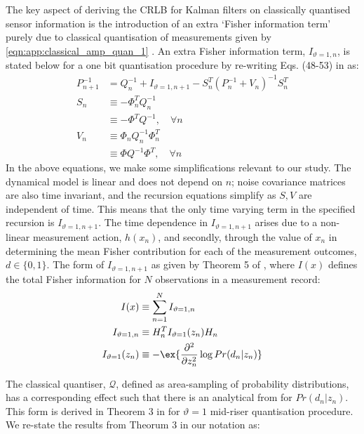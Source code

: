 The key aspect of deriving the CRLB for Kalman filters on classically quantised sensor information is the introduction of an extra `Fisher information term' purely due to classical quantisation of measurements given by \cref{eqn:app:classical_amp_quan_1}  \cite{karlsson2005}. An extra Fisher information term, $I_{\vartheta=1, n}$, is stated below for a one bit quantisation procedure by re-writing Eqs. (48-53) in \cite{karlsson2005} as:
\begin{align}
P_{n+1}^{-1} &= Q_n^{-1} + I_{\vartheta=1, n+1} - S_n^T(P^{-1}_n + V_n)^{-1} S^T_n \label{eqn:app:CRLB_recursion} \\
S_n &\equiv -\Phi_n^T Q_n^{-1} \\
&\equiv -\Phi^T Q^{-1}, \quad \forall n \\
V_n & \equiv \Phi_n Q_n^{-1} \Phi_n^T\\
& \equiv \Phi Q^{-1} \Phi^T , \quad \forall n 
\end{align} 
In the above equations, we make some simplifications relevant to our study. The dynamical model is linear and does not depend on $n$; noise covariance matrices are also time invariant, and the recursion equations simplify as $S, V$ are independent of time. This means that the only time varying term in the specified recursion is $I_{\vartheta=1, n+1}$. The time dependence in  $I_{\vartheta=1, n+1}$ arises due to a non-linear measurement action, $h(x_n)$, and secondly, through the value of $x_n$ in determining the mean Fisher contribution for each of the measurement outcomes, $d \in \{0,1\} $. The form of $I_{\vartheta=1, n+1}$ as given by Theorem 5 of \cite{karlsson2005}, where $I(x)$ defines the total Fisher information for $N$ observations in a measurement record:
\begin{align}
I(x) & \equiv \sum_{n=1}^{N} I_{\vartheta=1, n} \label{eqn:app:quantisedFisherinfo:total}\\
I_{\vartheta=1, n} & \equiv  H_n^T I_{\vartheta=1}(z_n) H_n  \label{eqn:app:quantisedFisherinfo:msmt}\\
I_{\vartheta=1}(z_n) & \equiv - \ex{\frac{\partial^2}{\partial z_n^2} \log Pr(d_n|z_n)} \label{eqn:app:quantisedFisherinfo}
\end{align}

The classical quantiser, $\mathcal{Q}$, defined as area-sampling of probability distributions, has a corresponding effect such that there is an analytical from for $Pr(d_n|z_n)$. This form is derived in Theorem 3 in \cite{karlsson2005} for $\vartheta=1$ mid-riser quantisation procedure. We re-state the results from Theorum 3 in our notation as:

